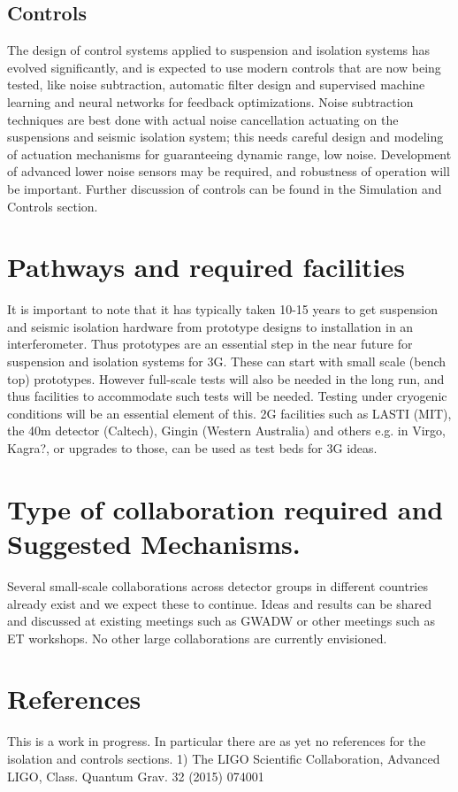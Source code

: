 \subsection{Controls}

The design of control systems applied to suspension and isolation systems has evolved significantly, and is expected to use modern controls that are now being tested, like noise subtraction, automatic filter design and supervised machine learning and neural networks for feedback optimizations. 
Noise subtraction techniques are best done with actual noise cancellation actuating on the suspensions and seismic isolation system; this needs careful design and modeling of actuation mechanisms for guaranteeing dynamic range, low noise.  Development of advanced lower noise sensors may be required, and robustness of operation will be important. 
Further discussion of controls can be found in the Simulation and Controls section.
\section{Pathways and required facilities}
It is important to note that it has typically taken 10-15 years to get suspension and seismic isolation hardware from prototype designs to installation in an interferometer. Thus prototypes are an essential step in the near future for suspension and isolation systems for 3G. These can start with small scale (bench top) prototypes. However full-scale tests will also be needed in the long run, and thus facilities to accommodate such tests will be needed.  Testing under cryogenic conditions will be an essential element of this. 2G facilities such as LASTI (MIT), the 40m detector (Caltech), Gingin (Western Australia) and others e.g. in Virgo, Kagra?, or upgrades to those, can be used as test beds for 3G ideas. 
\section{Type of collaboration required and Suggested Mechanisms.}
Several small-scale collaborations across detector groups in different countries already exist and we expect these to continue.  Ideas and results can be shared and discussed at existing meetings such as GWADW or other meetings such as ET workshops. No other large collaborations are currently envisioned.


\section{References}
This is a work in progress. In particular there are as yet no references for the isolation and controls sections.
1) The LIGO Scientific Collaboration, Advanced LIGO, Class. Quantum Grav. 32 (2015) 074001

